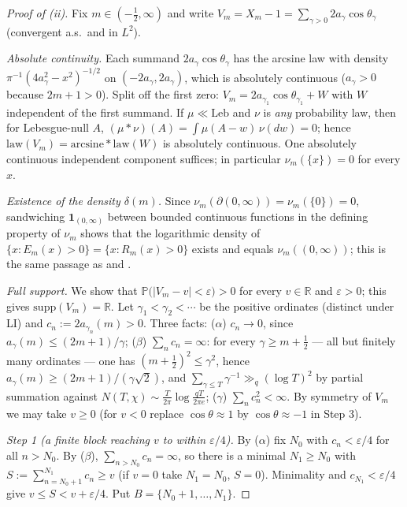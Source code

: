 \documentclass[11pt]{article}
\begin{document}
\begin{proof}[Proof of (ii)]
Fix $m\in(-\tfrac12,\infty)$ and write $V_m=X_m-1
=\sum_{\gamma>0}2a_\gamma\cos\theta_\gamma$ (convergent a.s.\ and in
$L^2$).

\emph{Absolute continuity.} Each summand $2a_\gamma\cos\theta_\gamma$
has the arcsine law with density
$\pi^{-1}(4a_\gamma^2-x^2)^{-1/2}$ on $(-2a_\gamma,2a_\gamma)$, which
is absolutely continuous ($a_\gamma>0$ because $2m+1>0$). Split off
the first zero: $V_m=2a_{\gamma_1}\cos\theta_{\gamma_1}+W$ with $W$
independent of the first summand. If $\mu\ll\mathrm{Leb}$ and $\nu$ is
\emph{any} probability law, then for Lebesgue-null $A$,
$(\mu*\nu)(A)=\int\mu(A-w)\,\nu(dw)=0$; hence
$\mathrm{law}(V_m)=\mathrm{arcsine}*\mathrm{law}(W)$ is absolutely
continuous. One absolutely continuous independent component suffices;
in particular $\nu_m(\{x\})=0$ for every $x$.

\emph{Existence of the density $\delta(m)$.} Since
$\nu_m(\partial(0,\infty))=\nu_m(\{0\})=0$, sandwiching
$\mathbf 1_{(0,\infty)}$ between bounded continuous functions in the
defining property of $\nu_m$ shows that the logarithmic density of
$\{x:E_m(x)>0\}=\{x:R_m(x)>0\}$ exists and equals
$\nu_m((0,\infty))$; this is the same passage as \cite[eq.~(1.22)]{ANS14} and \cite[\S2]{RS94}.

\emph{Full support.} We show that
$\mathbb P\bigl(|V_m-v|<\varepsilon\bigr)>0$ for every $v\in\mathbb R$
and $\varepsilon>0$; this gives $\mathrm{supp}(V_m)=\mathbb R$. Let
$\gamma_1<\gamma_2<\cdots$ be the positive ordinates (distinct under
LI) and $c_n:=2a_{\gamma_n}(m)>0$. Three facts:
($\alpha$) $c_n\to0$, since $a_\gamma(m)\le(2m+1)/\gamma$;
($\beta$) $\sum_nc_n=\infty$: for every $\gamma\ge m+\tfrac12$ --- all
but finitely many ordinates --- one has
$(m+\tfrac12)^2\le\gamma^2$, hence
$a_\gamma(m)\ge(2m+1)/(\gamma\sqrt2)$, and
$\sum_{\gamma\le T}\gamma^{-1}\gg_q(\log T)^2$ by partial summation
against $N(T,\chi)\sim\frac{T}{2\pi}\log\frac{qT}{2\pi e}$;
($\gamma$) $\sum_nc_n^2<\infty$. By symmetry of $V_m$ we may take
$v\ge0$ (for $v<0$ replace $\cos\theta\approx1$ by
$\cos\theta\approx-1$ in Step 3).

\emph{Step 1 (a finite block reaching $v$ to within $\varepsilon/4$).}
By ($\alpha$) fix $N_0$ with $c_n<\varepsilon/4$ for all $n>N_0$. By
($\beta$), $\sum_{n>N_0}c_n=\infty$, so there is a minimal $N_1\ge N_0$
with $S:=\sum_{n=N_0+1}^{N_1}c_n\ge v$ (if $v=0$ take $N_1=N_0$,
$S=0$). Minimality and $c_{N_1}<\varepsilon/4$ give
$v\le S<v+\varepsilon/4$. Put $B=\{N_0+1,\dots,N_1\}$.


\end{proof}
\end{document}
